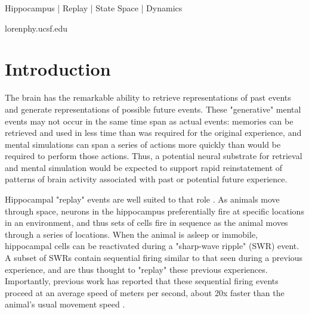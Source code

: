 \documentclass[times, twoside]{zHenriquesLab-StyleBioRxiv}
\begin{document}
\begin{keywords}
Hippocampus | Replay | State Space | Dynamics
\end{keywords}

\begin{corrauthor}
loren\at phy.ucsf.edu
\end{corrauthor}

\section*{Introduction}

The brain has the remarkable ability to retrieve representations of past events and generate representations of possible future events. These "generative" \cite{KayConstantSubsecondCycling2020} mental events may not occur in the same time span as actual events: memories can be retrieved and used in less time than was required for the original experience, and mental simulations can span a series of actions more quickly than would be required to perform those actions. Thus, a potential neural substrate for retrieval and mental simulation would be expected to support rapid reinstatement of patterns of brain activity associated with past or potential future experience.

Hippocampal "replay" events are well suited to that role \cite{CarrHippocampalreplayawake2011}. As animals move through space, neurons in the hippocampus preferentially fire at specific locations in an environment, and thus sets of cells fire in sequence as the animal moves through a series of locations. When the animal is asleep or immobile, hippocampal cells can be reactivated during a "sharp-wave ripple" (SWR) event. A subset of SWRs contain sequential firing similar to that seen during a previous experience, and are thus thought to "replay" these previous experiences. Importantly, previous work has reported that these sequential firing events proceed at an average speed of  meters per second, about 20x faster than the animal's usual movement speed \cite{NadasdyReplayTimeCompression1999, LeeMemorySequentialExperience2002, DavidsonHippocampalReplayExtended2009, KarlssonAwakereplayremote2009}. 
\end{document}
